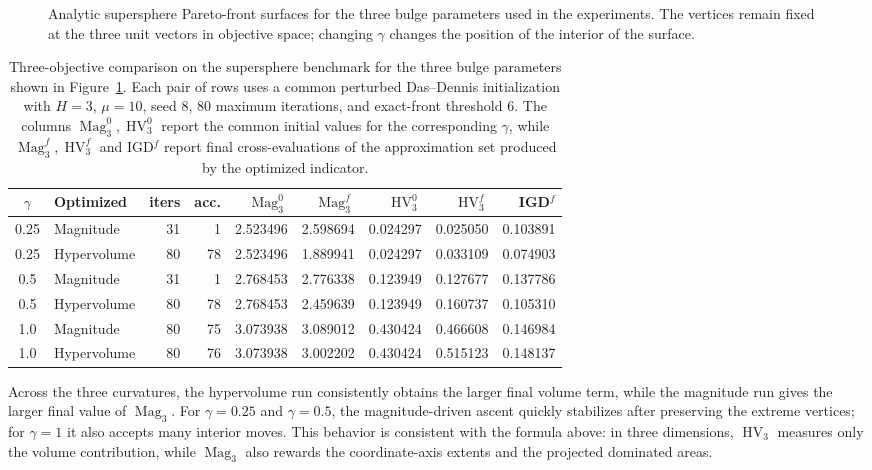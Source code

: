 \documentclass{article}
\newcommand{\Mag}{\operatorname{Mag}}
\newcommand{\HV}{\operatorname{HV}}
\begin{document}
\begin{figure}[htbp]
\centering
{}\hfill
{}\hfill
{}
\caption{Analytic supersphere Pareto-front surfaces for the three bulge parameters used in the experiments.  The vertices remain fixed at the three unit vectors in objective space; changing $\gamma$ changes the position of the interior of the surface.}
\label{fig:supersphere-gamma-surfaces}
\end{figure}

\begin{table}[htbp]
\centering
\small
\setlength{\tabcolsep}{4pt}
\begin{tabular}{clrrrrrrr}
\hline
$\gamma$ & Optimized & iters & acc. & $\Mag_3^0$ & $\Mag_3^f$ & $\HV_3^0$ & $\HV_3^f$ & IGD$^f$ \\
\hline
0.25 & Magnitude & 31 & 1 & 2.523496 & 2.598694 & 0.024297 & 0.025050 & 0.103891 \\
0.25 & Hypervolume & 80 & 78 & 2.523496 & 1.889941 & 0.024297 & 0.033109 & 0.074903 \\
0.5 & Magnitude & 31 & 1 & 2.768453 & 2.776338 & 0.123949 & 0.127677 & 0.137786 \\
0.5 & Hypervolume & 80 & 78 & 2.768453 & 2.459639 & 0.123949 & 0.160737 & 0.105310 \\
1.0 & Magnitude & 80 & 75 & 3.073938 & 3.089012 & 0.430424 & 0.466608 & 0.146984 \\
1.0 & Hypervolume & 80 & 76 & 3.073938 & 3.002202 & 0.430424 & 0.515123 & 0.148137 \\
\hline
\end{tabular}
\caption{Three-objective comparison on the supersphere benchmark for the three bulge parameters shown in Figure~\ref{fig:supersphere-gamma-surfaces}.  Each pair of rows uses a common perturbed Das--Dennis initialization with $H=3$, $\mu=10$, seed $8$, $80$ maximum iterations, and exact-front threshold $6$.  The columns $\Mag_3^0,\HV_3^0$ report the common initial values for the corresponding $\gamma$, while $\Mag_3^f,\HV_3^f$ and IGD$^f$ report final cross-evaluations of the approximation set produced by the optimized indicator.}
\label{tab:three-d-hv-vs-mag}
\end{table}

Across the three curvatures, the hypervolume run consistently obtains the larger final volume term, while the magnitude run gives the larger final value of $\Mag_3$.  For $\gamma=0.25$ and $\gamma=0.5$, the magnitude-driven ascent quickly stabilizes after preserving the extreme vertices; for $\gamma=1$ it also accepts many interior moves.  This behavior is consistent with the formula above: in three dimensions, $\HV_3$ measures only the volume contribution, while $\Mag_3$ also rewards the coordinate-axis extents and the projected dominated areas.
\end{document}
